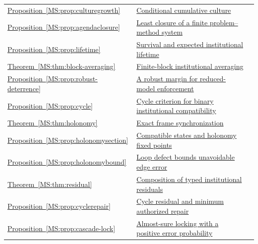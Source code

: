 \documentclass[11pt,oneside,openany]{book}
\numberwithin{equation}{section}
\begin{document}
\begin{longtable}{@{}P{.19\linewidth}P{.69\linewidth}r@{}}
\hyperref[MS:prop:culturegrowth]{Proposition~\ref*{MS:prop:culturegrowth}} & \hyperref[MS:prop:culturegrowth]{Conditional cumulative culture} & \pageref{MS:prop:culturegrowth}\\
\hyperref[MS:prop:agendaclosure]{Proposition~\ref*{MS:prop:agendaclosure}} & \hyperref[MS:prop:agendaclosure]{Least closure of a finite problem--method system} & \pageref{MS:prop:agendaclosure}\\
\hyperref[MS:prop:lifetime]{Proposition~\ref*{MS:prop:lifetime}} & \hyperref[MS:prop:lifetime]{Survival and expected institutional lifetime} & \pageref{MS:prop:lifetime}\\
\hyperref[MS:thm:block-averaging]{Theorem~\ref*{MS:thm:block-averaging}} & \hyperref[MS:thm:block-averaging]{Finite-block institutional averaging} & \pageref{MS:thm:block-averaging}\\
\hyperref[MS:prop:robust-deterrence]{Proposition~\ref*{MS:prop:robust-deterrence}} & \hyperref[MS:prop:robust-deterrence]{A robust margin for reduced-model enforcement} & \pageref{MS:prop:robust-deterrence}\\
\hyperref[MS:prop:cycle]{Proposition~\ref*{MS:prop:cycle}} & \hyperref[MS:prop:cycle]{Cycle criterion for binary institutional compatibility} & \pageref{MS:prop:cycle}\\
\hyperref[MS:thm:holonomy]{Theorem~\ref*{MS:thm:holonomy}} & \hyperref[MS:thm:holonomy]{Exact frame synchronization} & \pageref{MS:thm:holonomy}\\
\hyperref[MS:prop:holonomysection]{Proposition~\ref*{MS:prop:holonomysection}} & \hyperref[MS:prop:holonomysection]{Compatible states and holonomy fixed points} & \pageref{MS:prop:holonomysection}\\
\hyperref[MS:prop:holonomybound]{Proposition~\ref*{MS:prop:holonomybound}} & \hyperref[MS:prop:holonomybound]{Loop defect bounds unavoidable edge error} & \pageref{MS:prop:holonomybound}\\
\hyperref[MS:thm:residual]{Theorem~\ref*{MS:thm:residual}} & \hyperref[MS:thm:residual]{Composition of typed institutional residuals} & \pageref{MS:thm:residual}\\
\hyperref[MS:prop:cyclerepair]{Proposition~\ref*{MS:prop:cyclerepair}} & \hyperref[MS:prop:cyclerepair]{Cycle residual and minimum authorized repair} & \pageref{MS:prop:cyclerepair}\\
\hyperref[MS:prop:cascade-lock]{Proposition~\ref*{MS:prop:cascade-lock}} & \hyperref[MS:prop:cascade-lock]{Almost-sure locking with a positive error probability} & \pageref{MS:prop:cascade-lock}\\

\end{longtable}
\end{document}
